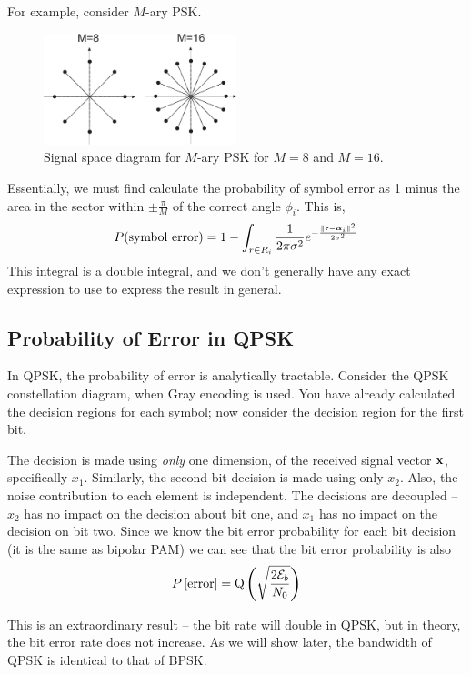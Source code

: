 For example, consider $M$-ary PSK.
\begin{figure}[htbp]
  \centerline{\includegraphics[width=0.5\textwidth]{../images/MPSK-signalSpaceDiagram.eps}}
  \caption{Signal space diagram for $M$-ary PSK for $M=8$ and $M=16$.}
  \label{F:MPSK-signalSpaceDiagram2}
\end{figure}
Essentially, we must find calculate the probability of symbol error
as 1 minus the area in the sector within $\pm \frac{\pi}{M}$ of the
correct angle $\phi_i$.  This is,
\begin{equation} \label{E:ExactMPSK-PE}
  P(\mbox{symbol error}) = 1 - \int_{r\in R_i} \frac{1}{2\pi \sigma^2} e^{-\frac{\| \mathbf{r} - {\boldsymbol{\alpha}}_i \|^2}{2\sigma^2}}
\end{equation}
This integral is a double integral, and we don't generally have any
exact expression to use to express the result in general.


\subsection{Probability of Error in QPSK}
In QPSK, the probability of error is analytically tractable. Consider the QPSK constellation diagram, when Gray encoding is used. You have already calculated the decision regions for each symbol; now consider the decision region for the first bit. 

The decision is made using \emph{only} one dimension, of the received signal vector $\mathbf{x}$, specifically $x_1$. Similarly, the second bit decision is made using only $x_2$.  Also, the noise contribution to each element is independent.  The decisions are decoupled -- $x_2$ has no impact on the decision about bit one, and $x_1$ has no impact on the decision on bit two.  Since we know the bit error probability for each bit decision (it is the same as
bipolar PAM) we can see that the bit error probability is also
\begin{equation}\label{E:ExactQPSK_PBE}
  P\left[{\mbox{error}}\right] = {\mbox{Q}\left( { \sqrt{\frac{2\mathcal{E}_b }{N_0}}} \right)}
\end{equation}

This is an extraordinary result -- the bit rate will double in QPSK, but in theory, the bit error rate does not increase.  As we will show later, the bandwidth of QPSK is identical to that of BPSK.


